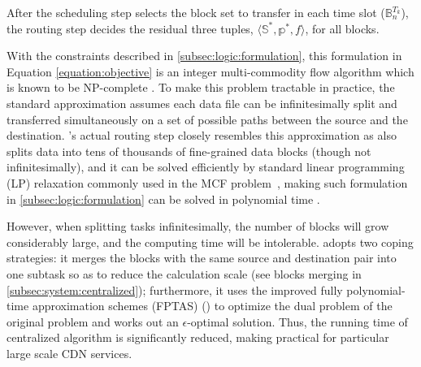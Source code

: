 After the scheduling step selects the block set to transfer in each time slot ($\mathbb{B}^{T_k}_n$), the routing step decides the residual three tuples, $\langle \mathbb{S}^*, \mathbb{p}^*, f \rangle$, for all blocks.

With the constraints described in \Section\ref{subsec:logic:formulation}, this formulation in Equation \ref{equation:objective} is an integer multi-commodity flow algorithm which is known to be NP-complete \cite{garg1997primal}.
To make this problem tractable in practice,
the standard approximation assumes each data file can be infinitesimally split and transferred simultaneously on a set of possible paths between the source and the destination.
\name's actual routing step closely resembles this approximation as \name also splits data into tens of thousands of fine-grained data blocks (though not infinitesimally), and it can be solved efficiently by standard linear programming (LP) relaxation commonly used in the MCF problem~\cite{garg2007faster},
making such formulation in \Section\ref{subsec:logic:formulation} can be solved in polynomial time \cite{reed2012traffic}.

However, when splitting tasks infinitesimally, the number of blocks will grow considerably large, and the computing time will be intolerable. \name adopts two coping strategies: it merges the blocks with the same source and destination pair into one subtask so as to reduce the calculation scale (see blocks merging in \Section\ref{subsec:system:centralized}); furthermore, it uses the improved fully polynomial-time approximation schemes (FPTAS) (\cite{fleischer2000approximating}) to optimize the dual problem of the original problem and works out an $\epsilon$-optimal solution. Thus, the running time of centralized algorithm is significantly reduced, making \name practical for particular large scale CDN services.
